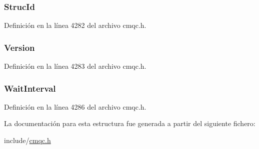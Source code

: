 \subsubsection[{Struc\+Id}]{ Struc\+Id}\label{structtag_m_q_g_m_o_a0530922ca944569b52601d74941f96e4}


Definición en la línea 4282 del archivo cmqc.\+h.

\hypertarget{structtag_m_q_g_m_o_a0656ef8f766b3907d394d88a35d7b7e9}{}
\subsubsection[{Version}]{ Version}\label{structtag_m_q_g_m_o_a0656ef8f766b3907d394d88a35d7b7e9}


Definición en la línea 4283 del archivo cmqc.\+h.

\hypertarget{structtag_m_q_g_m_o_a6f3538bd01d237755fd6ab7dad5584d0}{}
\subsubsection[{Wait\+Interval}]{ Wait\+Interval}\label{structtag_m_q_g_m_o_a6f3538bd01d237755fd6ab7dad5584d0}


Definición en la línea 4286 del archivo cmqc.\+h.



La documentación para esta estructura fue generada a partir del siguiente fichero\+:\begin{DoxyCompactItemize}
\item 
include/\hyperlink{cmqc_8h}{cmqc.\+h}\end{DoxyCompactItemize}
